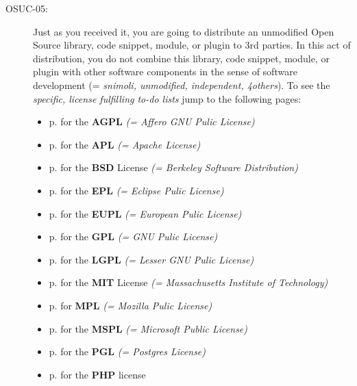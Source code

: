 \begin{description}
\item[OSUC-05:]\label{OSUC-05-DEF} Just as you received it, you are going to
distribute an unmodified Open Source library, code snippet, module, or plugin to
3rd parties. In this act of distribution, you do not combine this library, code
snippet, module, or plugin with other software components in the sense of
software development (= \textit{snimoli, unmodified, independent, 4others}).
To see the \textit{specific, license fulfilling to-do lists} jump to the
following pages:
  \begin{itemize}
    \item p. \pageref{OSUC-05-AGPL} for the \textbf{AGPL}
      \textit{(= Affero GNU Pulic License)} 
    \item p. \pageref{OSUC-05-Apache20} for the \textbf{APL}
      \textit{(= Apache License)}
    \item p. \pageref{OSUC-05-BSD} for the \textbf{BSD} License
      \textit{(= Berkeley Software Distribution)}
    \item p. \pageref{OSUC-05-EPL} for the \textbf{EPL}
      \textit{(= Eclipse Pulic License)}     
    \item p. \pageref{OSUC-05-EUPL} for the \textbf{EUPL}
      \textit{(= European Pulic License)} 
    \item p. \pageref{OSUC-05-GPL} for the \textbf{GPL}
       \textit{(= GNU Pulic License)} 
    \item p. \pageref{OSUC-05-LGPL} for the \textbf{LGPL}
      \textit{(= Lesser GNU Pulic License)}           
    \item p. \pageref{OSUC-05-MIT} for the \textbf{MIT} License
       \textit{(= Massachusetts Institute of Technology)} 
    \item p. \pageref{OSUC-05-MPL} for \textbf{MPL}
      \textit{(= Mozilla Pulic License)}     
    \item p. \pageref{OSUC-05-MsPL} for the \textbf{MSPL}
      \textit{(= Microsoft Public License)} 
    \item p. \pageref{OSUC-05-PGL} for the \textbf{PGL}
      \textit{(= Postgres License)} 
    \item p. \pageref{OSUC-05-PHP} for the \textbf{PHP} license 
  \end{itemize}


\end{description}

